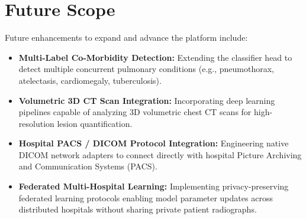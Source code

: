 \documentclass[12pt,a4paper]{report}
\begin{document}
\section{Future Scope}
Future enhancements to expand and advance the platform include:
\begin{itemize}
    \item \textbf{Multi-Label Co-Morbidity Detection:} Extending the classifier head to detect multiple concurrent pulmonary conditions (e.g., pneumothorax, atelectasis, cardiomegaly, tuberculosis).
    \item \textbf{Volumetric 3D CT Scan Integration:} Incorporating deep learning pipelines capable of analyzing 3D volumetric chest CT scans for high-resolution lesion quantification.
    \item \textbf{Hospital PACS / DICOM Protocol Integration:} Engineering native DICOM network adapters to connect directly with hospital Picture Archiving and Communication Systems (PACS).
    \item \textbf{Federated Multi-Hospital Learning:} Implementing privacy-preserving federated learning protocols enabling model parameter updates across distributed hospitals without sharing private patient radiographs.
\end{itemize}
\end{document}

